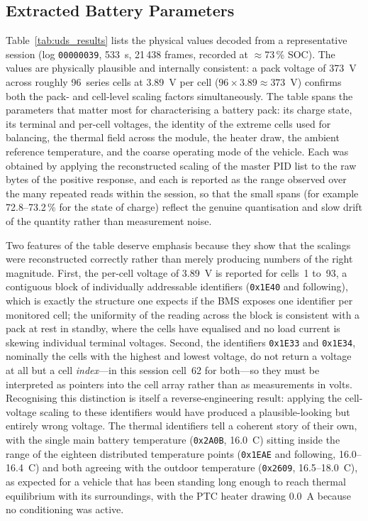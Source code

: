 \documentclass[11pt,a4paper,oneside,parskip=half]{scrreprt}
\providecommand{\hex}{}\renewcommand{\hex}[1]{\texttt{0x#1}}
\begin{document}
\subsection{Extracted Battery Parameters}
Table~\ref{tab:uds_results} lists the physical values decoded from a representative session (log \texttt{00000039}, 533~s, 21\,438 frames, recorded at $\approx$73\,\% SOC). The values are physically plausible and internally consistent: a pack voltage of 373~V across roughly 96~series cells at 3.89~V per cell ($96\times3.89\approx373$~V) confirms both the pack- and cell-level scaling factors simultaneously. The table spans the parameters that matter most for characterising a battery pack: its charge state, its terminal and per-cell voltages, the identity of the extreme cells used for balancing, the thermal field across the module, the heater draw, the ambient reference temperature, and the coarse operating mode of the vehicle. Each was obtained by applying the reconstructed scaling of the master PID list to the raw bytes of the positive response, and each is reported as the range observed over the many repeated reads within the session, so that the small spans (for example 72.8--73.2\,\% for the state of charge) reflect the genuine quantisation and slow drift of the quantity rather than measurement noise.

Two features of the table deserve emphasis because they show that the scalings were reconstructed correctly rather than merely producing numbers of the right magnitude. First, the per-cell voltage of 3.89~V is reported for cells~1 to~93, a contiguous block of individually addressable identifiers (\hex{1E40} and following), which is exactly the structure one expects if the BMS exposes one identifier per monitored cell; the uniformity of the reading across the block is consistent with a pack at rest in standby, where the cells have equalised and no load current is skewing individual terminal voltages. Second, the identifiers \hex{1E33} and \hex{1E34}, nominally the cells with the highest and lowest voltage, do not return a voltage at all but a cell \emph{index}---in this session cell~62 for both---so they must be interpreted as pointers into the cell array rather than as measurements in volts. Recognising this distinction is itself a reverse-engineering result: applying the cell-voltage scaling to these identifiers would have produced a plausible-looking but entirely wrong voltage. The thermal identifiers tell a coherent story of their own, with the single main battery temperature (\hex{2A0B}, 16.0~\textdegree C) sitting inside the range of the eighteen distributed temperature points (\hex{1EAE} and following, 16.0--16.4~\textdegree C) and both agreeing with the outdoor temperature (\hex{2609}, 16.5--18.0~\textdegree C), as expected for a vehicle that has been standing long enough to reach thermal equilibrium with its surroundings, with the PTC heater drawing 0.0~A because no conditioning was active.
\end{document}
